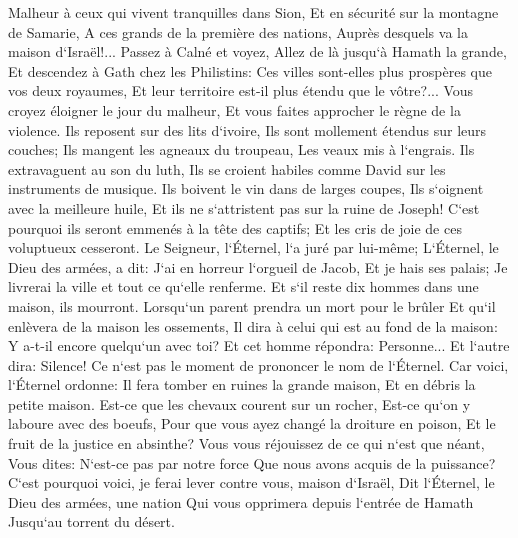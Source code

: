 \verse Malheur à ceux qui vivent tranquilles dans Sion, Et en sécurité sur la montagne de Samarie, A ces grands de la première des nations, Auprès desquels va la maison d`Israël!... 
\verse Passez à Calné et voyez, Allez de là jusqu`à Hamath la grande, Et descendez à Gath chez les Philistins: Ces villes sont-elles plus prospères que vos deux royaumes, Et leur territoire est-il plus étendu que le vôtre?... 
\verse Vous croyez éloigner le jour du malheur, Et vous faites approcher le règne de la violence. 
\verse Ils reposent sur des lits d`ivoire, Ils sont mollement étendus sur leurs couches; Ils mangent les agneaux du troupeau, Les veaux mis à l`engrais. 
\verse Ils extravaguent au son du luth, Ils se croient habiles comme David sur les instruments de musique. 
\verse Ils boivent le vin dans de larges coupes, Ils s`oignent avec la meilleure huile, Et ils ne s`attristent pas sur la ruine de Joseph! 
\verse C`est pourquoi ils seront emmenés à la tête des captifs; Et les cris de joie de ces voluptueux cesseront. 
\verse Le Seigneur, l`Éternel, l`a juré par lui-même; L`Éternel, le Dieu des armées, a dit: J`ai en horreur l`orgueil de Jacob, Et je hais ses palais; Je livrerai la ville et tout ce qu`elle renferme. 
\verse Et s`il reste dix hommes dans une maison, ils mourront. 
\verse Lorsqu`un parent prendra un mort pour le brûler Et qu`il enlèvera de la maison les ossements, Il dira à celui qui est au fond de la maison: Y a-t-il encore quelqu`un avec toi? Et cet homme répondra: Personne... Et l`autre dira: Silence! Ce n`est pas le moment de prononcer le nom de l`Éternel. 
\verse Car voici, l`Éternel ordonne: Il fera tomber en ruines la grande maison, Et en débris la petite maison. 
\verse Est-ce que les chevaux courent sur un rocher, Est-ce qu`on y laboure avec des boeufs, Pour que vous ayez changé la droiture en poison, Et le fruit de la justice en absinthe? 
\verse Vous vous réjouissez de ce qui n`est que néant, Vous dites: N`est-ce pas par notre force Que nous avons acquis de la puissance? 
\verse C`est pourquoi voici, je ferai lever contre vous, maison d`Israël, Dit l`Éternel, le Dieu des armées, une nation Qui vous opprimera depuis l`entrée de Hamath Jusqu`au torrent du désert. 

\chapter{}

